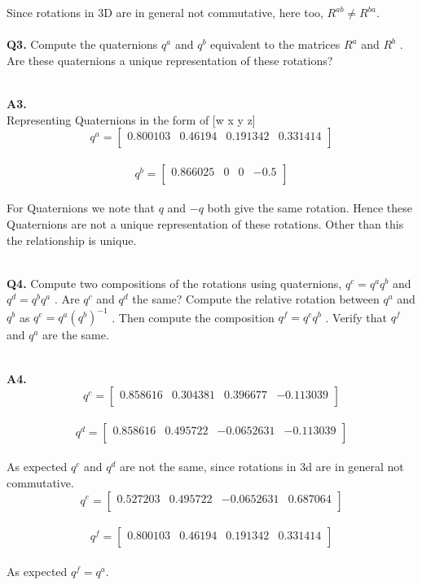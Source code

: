 \documentclass{article}
\newcommand\Problem[1]{
  \\
  \textbf{Q#1.}
}
\newcommand\Sol[1]{
  \\
  \textbf{A#1.}
  \\
}
\begin{document}
Since rotations in 3D are in general not commutative, here too, $R^{ab} \neq R^{ba}$.
\\
\Problem{3} Compute the quaternions $q^a$ and $q^b$ equivalent to the matrices $R^a$ and $R^b$ . Are these quaternions a unique representation of these rotations?
\Sol{3}
Representing Quaternions in the form of [w x y z]
\[
  q^a =
  \begin{bmatrix}
    0.800103 & 0.46194 & 0.191342 & 0.331414\\
  \end{bmatrix}
\]
\\
\[
  q^b =
  \begin{bmatrix}
    0.866025 &
       0 &
       0 &
    -0.5 \\

  \end{bmatrix}
\]
\\
For Quaternions we note that $q$ and $-q$ both give the same rotation. Hence these Quaternions are not a unique representation of these rotations. Other than this the relationship is unique.

\Problem{4} Compute two compositions of the rotations using quaternions, $q^c = q^aq^b$ and 
$q^d = q^bq^a$ . Are $q^c$ and $q^d$ the same? Compute the relative rotation between $q^a$ and
$q^b$ as $q^e = q^a(q^b)^{-1}$ . Then compute the composition $q^f = q^eq^b$ . Verify that $q^f$ and
$q^a$ are the same.
\Sol{4}
\[
  q^c =
  \begin{bmatrix}
    0.858616&
    0.304381&
    0.396677&
    -0.113039\\
  \end{bmatrix}
\]
\\
\[
  q^d =
  \begin{bmatrix}
    0.858616&
    0.495722&
    -0.0652631&
    -0.113039\\
  \end{bmatrix}
\]
\\
As expected $q^c$ and $q^d$ are not the same, since rotations in 3d are in general not commutative.
\[
  q^e =
  \begin{bmatrix}
    0.527203&
    0.495722&
    -0.0652631&
    0.687064\\
  \end{bmatrix}
\]
\\
\[
  q^f =
  \begin{bmatrix}
    0.800103&
    0.46194&
    0.191342&
    0.331414\\
  \end{bmatrix}
\]
\\
As expected $q^f = q^a$.
\end{document}
